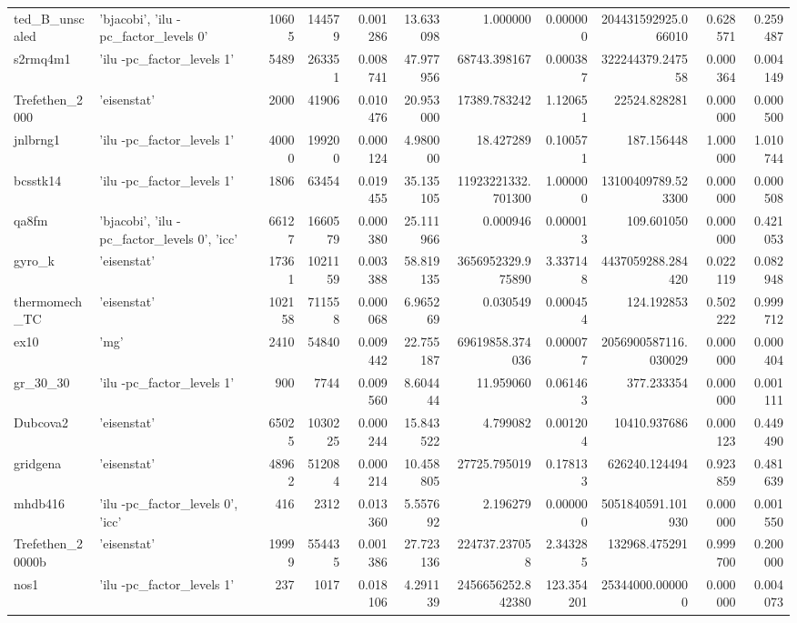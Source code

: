\begin{tabular}{llrrrrrrrrr}
ted\_B\_unscaled & {'bjacobi', 'ilu -pc\_factor\_levels 0'} & 10605 & 144579 & 0.001286 & 13.633098 & 1.000000 & 0.000000 & 204431592925.066010 & 0.628571 & 0.259487 \\
s2rmq4m1 & {'ilu -pc\_factor\_levels 1'} & 5489 & 263351 & 0.008741 & 47.977956 & 68743.398167 & 0.000387 & 322244379.247558 & 0.000364 & 0.004149 \\
Trefethen\_2000 & {'eisenstat'} & 2000 & 41906 & 0.010476 & 20.953000 & 17389.783242 & 1.120651 & 22524.828281 & 0.000000 & 0.000500 \\
jnlbrng1 & {'ilu -pc\_factor\_levels 1'} & 40000 & 199200 & 0.000124 & 4.980000 & 18.427289 & 0.100571 & 187.156448 & 1.000000 & 1.010744 \\
bcsstk14 & {'ilu -pc\_factor\_levels 1'} & 1806 & 63454 & 0.019455 & 35.135105 & 11923221332.701300 & 1.000000 & 13100409789.523300 & 0.000000 & 0.000508 \\
qa8fm & {'bjacobi', 'ilu -pc\_factor\_levels 0', 'icc'} & 66127 & 1660579 & 0.000380 & 25.111966 & 0.000946 & 0.000013 & 109.601050 & 0.000000 & 0.421053 \\
gyro\_k & {'eisenstat'} & 17361 & 1021159 & 0.003388 & 58.819135 & 3656952329.975890 & 3.337148 & 4437059288.284420 & 0.022119 & 0.082948 \\
thermomech\_TC & {'eisenstat'} & 102158 & 711558 & 0.000068 & 6.965269 & 0.030549 & 0.000454 & 124.192853 & 0.502222 & 0.999712 \\
ex10 & {'mg'} & 2410 & 54840 & 0.009442 & 22.755187 & 69619858.374036 & 0.000077 & 2056900587116.030029 & 0.000000 & 0.000404 \\
gr\_30\_30 & {'ilu -pc\_factor\_levels 1'} & 900 & 7744 & 0.009560 & 8.604444 & 11.959060 & 0.061463 & 377.233354 & 0.000000 & 0.001111 \\
Dubcova2 & {'eisenstat'} & 65025 & 1030225 & 0.000244 & 15.843522 & 4.799082 & 0.001204 & 10410.937686 & 0.000123 & 0.449490 \\
gridgena & {'eisenstat'} & 48962 & 512084 & 0.000214 & 10.458805 & 27725.795019 & 0.178133 & 626240.124494 & 0.923859 & 0.481639 \\
mhdb416 & {'ilu -pc\_factor\_levels 0', 'icc'} & 416 & 2312 & 0.013360 & 5.557692 & 2.196279 & 0.000000 & 5051840591.101930 & 0.000000 & 0.001550 \\
Trefethen\_20000b & {'eisenstat'} & 19999 & 554435 & 0.001386 & 27.723136 & 224737.237058 & 2.343285 & 132968.475291 & 0.999700 & 0.200000 \\
nos1 & {'ilu -pc\_factor\_levels 1'} & 237 & 1017 & 0.018106 & 4.291139 & 2456656252.842380 & 123.354201 & 25344000.000000 & 0.000000 & 0.004073 \\

\end{tabular}
